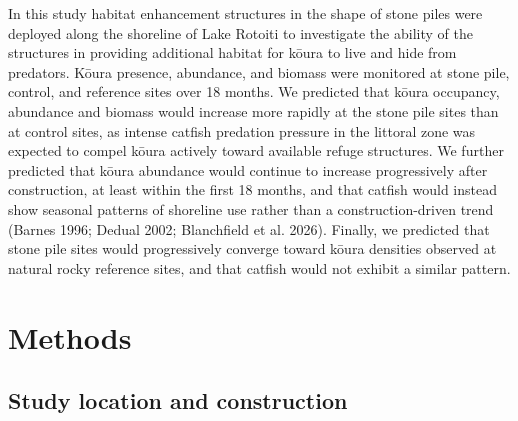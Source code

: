 \documentclass[
  12pt,
  a4paper,
  oneside]{scrbook}
\begin{document}
In this study habitat enhancement structures in the shape of stone piles
were deployed along the shoreline of Lake Rotoiti to investigate the
ability of the structures in providing additional habitat for kōura to
live and hide from predators. Kōura presence, abundance, and biomass
were monitored at stone pile, control, and reference sites over 18
months. We predicted that kōura occupancy, abundance and biomass would
increase more rapidly at the stone pile sites than at control sites, as
intense catfish predation pressure in the littoral zone was expected to
compel kōura actively toward available refuge structures. We further
predicted that kōura abundance would continue to increase progressively
after construction, at least within the first 18 months, and that
catfish would instead show seasonal patterns of shoreline use rather
than a construction-driven trend (Barnes 1996; Dedual 2002; Blanchfield
et al. 2026). Finally, we predicted that stone pile sites would
progressively converge toward kōura densities observed at natural rocky
reference sites, and that catfish would not exhibit a similar pattern.

\section{Methods}\label{methods-3}

\subsection{Study location and
construction}\label{study-location-and-construction}
\end{document}
